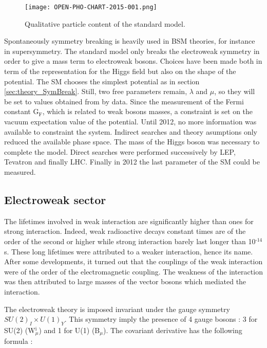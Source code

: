 \begin{figure}[htbp]
\centering
\texttt{[image: OPEN-PHO-CHART-2015-001.png]}
\caption{\label{fig:org1db6618}
Qualitative particle content of the standard model. \cite{OPEN-PHO-CHART-2015-001}}
\end{figure}

Spontaneously symmetry breaking is heavily used in BSM theories, for instance in supersymmetry.
The standard model only breaks the electroweak symmetry in order to give a mass term to electroweak bosons.
Choices have been made both in term of the representation for the Higgs field but also on the shape of the potential.
The SM chooses the simplest potential as in section \ref{sec:theory_SymBreak}.
Still, two free parameters remain, \(\lambda\) and \(\mu\), so they will be set to values obtained from by data.
Since the measurement of the Fermi constant G\(_{\text{F}}\), which is related to weak bosons masses, a constraint is set on the vacuum expectation value of the potential.
Until 2012, no more information was available to constraint the system.
Indirect searches and theory asumptions only reduced the available phase space.
The mass of the Higgs boson was necessary to complete the model.
Direct searches were performed successively by LEP, Tevatron and finally LHC.
Finally in 2012 the last parameter of the SM could be measured.

\subsection{Electroweak sector}
\label{sec:orga4e442f}

The lifetimes involved in weak interaction are significantly higher than ones for strong interaction.
Indeed, weak radioactive decays constant times are of the order of the second or higher while strong interaction barely last longer than 10\(^{\text{-14}}\)s.
These long lifetimes were attributed to a weaker interaction, hence its name.
After some developments, it turned out that the couplings of the weak interaction were of the order of the electromagnetic coupling.
The weakness of the interaction was then attributed to large masses of the vector bosons which mediated the interaction.

The electroweak theory is imposed invariant under the gauge symmetry \(SU(2)_I\times U(1)_Y\).
This symmetry imply the presence of 4 gauge bosons : 3 for SU(2) (W\(^{\text{i}}_{\mu}\)) and 1 for U(1) (B\(_{\mu}\)).
The covariant derivative has the following formula :

